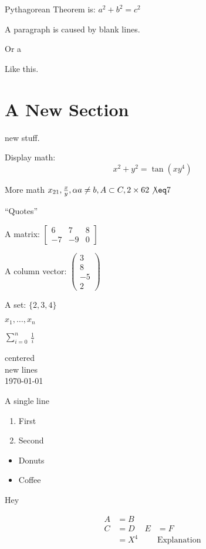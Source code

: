 \documentclass[12pt]{article}
\begin{document}
Pythagorean Theorem is: \(a^2 + b^2 = c^2\)

A paragraph is caused by blank lines.

Or a \par Like this.
\section{A New Section}

new stuff.

Display math: \[x^2+y^2=\tan(xy^4)\]


More math \(x_{21}, \frac{x}{y}, \alpha a \neq b, A \subset C, 2\times 6 2\not\eq 7\)

``Quotes''

A matrix:
\(\begin{bmatrix}
6 & 7 & 8\\
-7 & -9 & 0
\end{bmatrix}\)

A column vector:
\(\begin{pmatrix}
3\\
8\\
-5\\
2
\end{pmatrix}\)

A set: \(\{2,3,4\}\)

\(x_1, \ldots, x_n\)

\(\sum_{i=0}^{n}\,\frac{1}{i}\)

\begin{center}
centered\\
new lines\\
\today
\end{center}
\centerline{A single line}

\begin{enumerate}
\item First
\item Second
\end{enumerate}

\begin{itemize}
\item Donuts
\item Coffee
\end{itemize}

\newpage

Hey

\begin{align*}
 A &= B\\
 C &= D & E&=F\\
 &=X^4&&\text{Explanation}
\end{align*}
\end{document}
